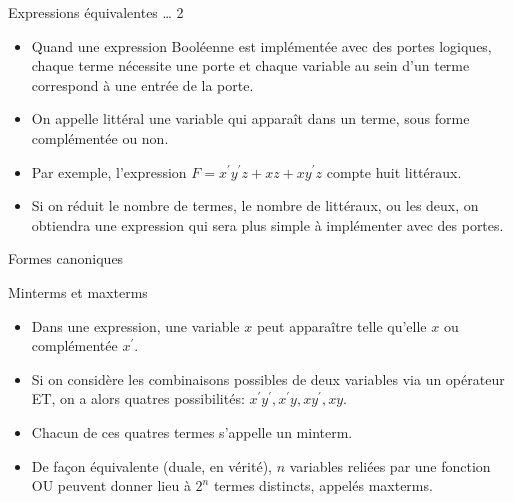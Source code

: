 \documentclass[presentation]{beamer}
\begin{document}
\begin{frame}[label={sec:org0c9b18e}]{Expressions équivalentes \ldots{} 2}
\begin{itemize}
\item Quand une expression Booléenne est implémentée avec des portes logiques, chaque terme nécessite une porte et chaque variable au sein d'un terme correspond à une entrée de la porte.

\item On appelle \alert{littéral} une variable qui apparaît dans un terme, sous forme complémentée ou non.

\item Par exemple, l'expression \(F = x^\prime y^\prime z + xz + xy^\prime z\) compte huit littéraux.

\item Si on réduit le nombre de termes, le nombre de littéraux, ou les deux, on obtiendra une expression qui sera plus simple à implémenter avec des portes.
\end{itemize}
\end{frame}

\begin{frame}[label={sec:org05550ce}]{Formes canoniques}
\begin{block}{Minterms et maxterms}
\begin{itemize}
\item Dans une expression, une variable \(x\) peut apparaître telle qu'elle \(x\) ou complémentée \(x^\prime\).

\item Si on considère les combinaisons possibles de deux variables via un opérateur ET, on a alors quatres possibilités: \(x^\prime y^\prime, x^\prime y, x y^\prime,x y\).

\item Chacun de ces quatres termes s'appelle un \alert{minterm}.

\item De façon équivalente (duale, en vérité), \(n\) variables reliées par une fonction OU peuvent donner lieu à \(2^n\) termes distincts, appelés \alert{maxterms}.
\end{itemize}
\end{block}
\end{frame}
\end{document}
